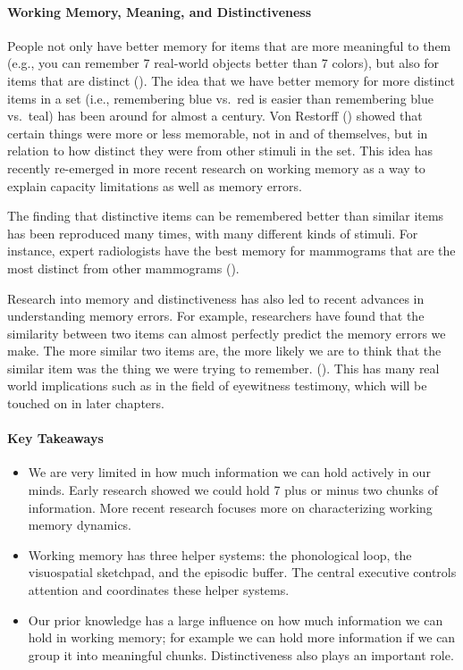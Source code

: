 \documentclass[
]{krantz}
\providecommand{\tightlist}{%
  \setlength{\itemsep}{0pt}\setlength{\parskip}{0pt}}
\begin{document}
\paragraph*{Working Memory, Meaning, and Distinctiveness}\label{working-memory-meaning-and-distinctiveness}

People not only have better memory for items that are more meaningful to them (e.g., you can remember 7 real-world objects better than 7 colors), but also for items that are distinct (). The idea that we have better memory for more distinct items in a set (i.e., remembering blue vs.~red is easier than remembering blue vs.~teal) has been around for almost a century. Von Restorff () showed that certain things were more or less memorable, not in and of themselves, but in relation to how distinct they were from other stimuli in the set. This idea has recently re-emerged in more recent research on working memory as a way to explain capacity limitations as well as memory errors.

The finding that distinctive items can be remembered better than similar items has been reproduced many times, with many different kinds of stimuli. For instance, expert radiologists have the best memory for mammograms that are the most distinct from other mammograms ().

Research into memory and distinctiveness has also led to recent advances in understanding memory errors. For example, researchers have found that the similarity between two items can almost perfectly predict the memory errors we make. The more similar two items are, the more likely we are to think that the similar item was the thing we were trying to remember. (). This has many real world implications such as in the field of eyewitness testimony, which will be touched on in later chapters.

\paragraph*{Key Takeaways}\label{key-takeaways-3}

\begin{itemize}
\tightlist
\item
  We are very limited in how much information we can hold actively in our minds. Early research showed we could hold 7 plus or minus two chunks of information. More recent research focuses more on characterizing working memory dynamics.
\item
  Working memory has three helper systems: the phonological loop, the visuospatial sketchpad, and the episodic buffer. The central executive controls attention and coordinates these helper systems.
\item
  Our prior knowledge has a large influence on how much information we can hold in working memory; for example we can hold more information if we can group it into meaningful chunks. Distinctiveness also plays an important role.
\end{itemize}
\end{document}
